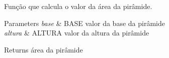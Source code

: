 Função que calcula o valor da área da pirâmide. 


\begin{DoxyParams}{Parameters}
{\em base} & B\+A\+SE valor da base da pirâmide \\
\hline
{\em altura} & A\+L\+T\+U\+RA valor da altura da pirâmide \\
\hline
\end{DoxyParams}
\begin{DoxyReturn}{Returns}
área da pirâmide 
\end{DoxyReturn}
